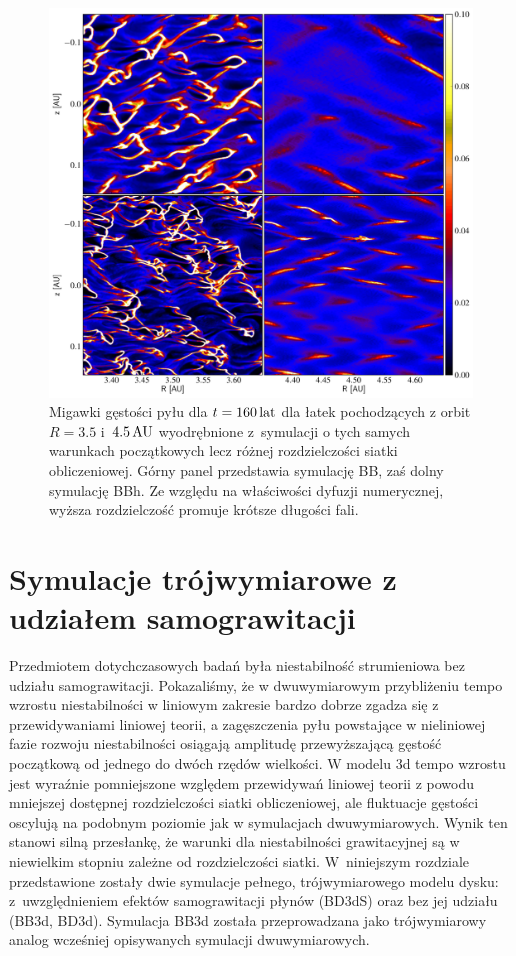 \begin{figure}
   \includegraphics[width=0.98\linewidth]{figures/fig10}
   \caption{Migawki gęstości pyłu dla $t = 160\hbox{$\thinspace\textrm{lat}$}$ dla łatek pochodzących z
      orbit $R=3.5$ i~$4.5\hbox{$\thinspace\textrm{AU}$}$ wyodrębnione z~symulacji o tych samych warunkach
      początkowych lecz różnej rozdzielczości siatki obliczeniowej. Górny panel
      przedstawia symulację BB, zaś dolny symulację BBh. Ze względu na właściwości
      dyfuzji numerycznej, wyższa rozdzielczość promuje krótsze długości
      fali.}
   \label{fig10} 
\end{figure}

\section{Symulacje trójwymiarowe z udziałem samograwitacji}
\label{sec:sim_3d}
Przedmiotem dotychczasowych badań była niestabilność strumieniowa bez udziału
samograwitacji. Pokazaliśmy, że w dwuwymiarowym przybliżeniu tempo wzrostu
niestabilności w liniowym zakresie bardzo dobrze zgadza się z przewidywaniami
liniowej teorii, a zagęszczenia pyłu powstające w nieliniowej fazie rozwoju
niestabilności osiągają amplitudę przewyższającą gęstość początkową od jednego
do dwóch rzędów wielkości. W modelu 3d tempo wzrostu jest wyraźnie pomniejszone
względem przewidywań liniowej teorii z powodu mniejszej dostępnej rozdzielczości
siatki obliczeniowej, ale fluktuacje gęstości oscylują na podobnym poziomie jak
w symulacjach dwuwymiarowych. Wynik ten stanowi silną przesłankę, że warunki dla
niestabilności grawitacyjnej są w niewielkim stopniu zależne od rozdzielczości
siatki. W~niniejszym rozdziale przedstawione zostały dwie symulacje pełnego,
trójwymiarowego modelu dysku: z~uwzględnieniem efektów samograwitacji płynów
(BD3dS) oraz bez jej udziału (BB3d, BD3d). Symulacja BB3d została przeprowadzana
jako trójwymiarowy analog wcześniej opisywanych symulacji dwuwymiarowych.


